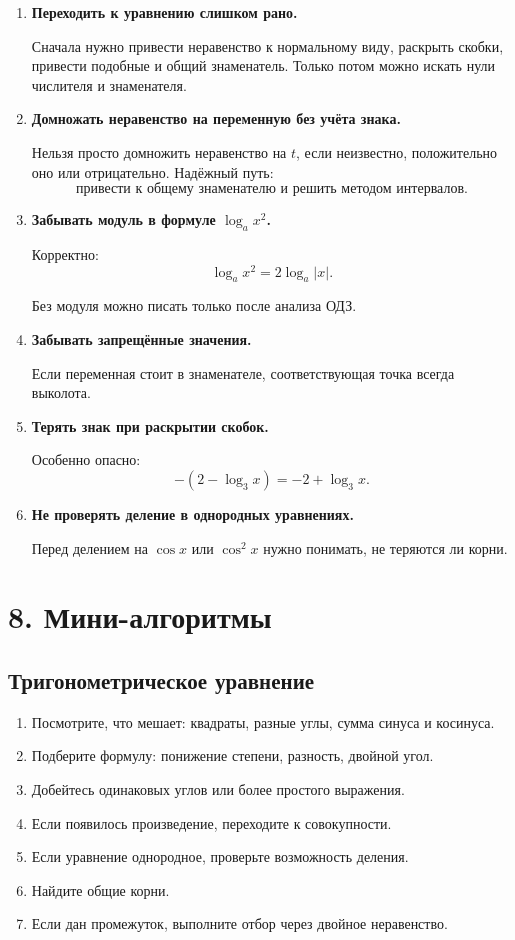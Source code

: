 \documentclass[a4paper,12pt]{article}
\newcommand{\important}[1]{\textcolor{darkaccent}{\textbf{#1}}}
\begin{document}
\begin{enumerate}
    \item \important{Переходить к уравнению слишком рано.}

    Сначала нужно привести неравенство к нормальному виду, раскрыть скобки, привести подобные и общий знаменатель. Только потом можно искать нули числителя и знаменателя.

    \item \important{Домножать неравенство на переменную без учёта знака.}

    Нельзя просто домножить неравенство на $t$, если неизвестно, положительно оно или отрицательно. Надёжный путь:
    \[
    \text{привести к общему знаменателю и решить методом интервалов.}
    \]

    \item \important{Забывать модуль в формуле $\log_a x^2$.}

    Корректно:
    \[
    \log_a x^2=2\log_a|x|.
    \]

    Без модуля можно писать только после анализа ОДЗ.

    \item \important{Забывать запрещённые значения.}

    Если переменная стоит в знаменателе, соответствующая точка всегда выколота.

    \item \important{Терять знак при раскрытии скобок.}

    Особенно опасно:
    \[
    -\left(2-\log_3x\right)=-2+\log_3x.
    \]

    \item \important{Не проверять деление в однородных уравнениях.}

    Перед делением на $\cos x$ или $\cos^2x$ нужно понимать, не теряются ли корни.
\end{enumerate}

\section*{8. Мини-алгоритмы}

\subsection*{Тригонометрическое уравнение}

\begin{enumerate}
    \item Посмотрите, что мешает: квадраты, разные углы, сумма синуса и косинуса.
    \item Подберите формулу: понижение степени, разность, двойной угол.
    \item Добейтесь одинаковых углов или более простого выражения.
    \item Если появилось произведение, переходите к совокупности.
    \item Если уравнение однородное, проверьте возможность деления.
    \item Найдите общие корни.
    \item Если дан промежуток, выполните отбор через двойное неравенство.
\end{enumerate}
\end{document}
